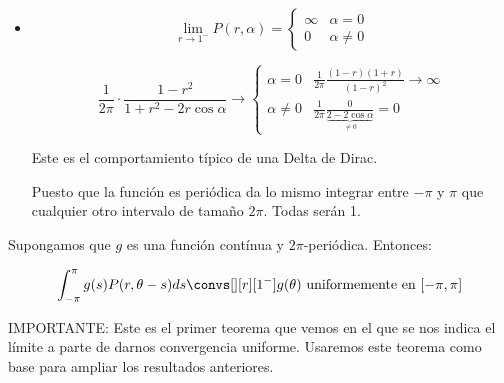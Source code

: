\begin{itemize}
			\item \[
			\lim_{r \to 1^-} P(r, \alpha) = \begin{cases}
				\infty & \alpha = 0 \\
				0 & \alpha \neq 0
			\end{cases}
			\]

			\[
				\frac{1}{2\pi} \cdot \frac{1-r^2}{1+r^2-2r\cos \alpha} \rightarrow \begin{cases}
				\alpha = 0 & \frac{1}{2\pi} \frac{(1-r)(1+r)}{(1-r)^2} \rightarrow \infty \\
				\alpha \neq 0  & \frac{1}{2\pi} \frac{0}{\underbrace{2-2\cos \alpha}_{\neq 0}} = 0
				\end{cases}
			\]

			Este es el comportamiento típico de una Delta de Dirac.

			\begin{center}
			\end{center}

			Puesto que la función es periódica da lo mismo integrar entre $-\pi$ y $\pi$ que cualquier otro intervalo de tamaño $2\pi$. Todas serán 1.

		\end{itemize}

		\begin{theorem}
			Supongamos que $g$ es una función contínua y $2\pi$-periódica. Entonces:

			\[ \int^\pi_{-\pi} g(s)P(r, \theta-s) ds \convs[][r][1^-] g(\theta) \text{ uniformemente en } [-\pi,\pi] \]

			IMPORTANTE: Este es el primer teorema que vemos en el que se nos indica el límite a parte de darnos convergencia uniforme. Usaremos este teorema como base para ampliar los resultados anteriores.
		\end{theorem}

